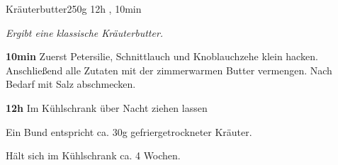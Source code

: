 \documentclass[../recipe-collections/cooking.tex]{subfiles}
\begin{document}
\begin{recipe}{Kräuterbutter}{250g }{12h , 10min }

  \freeform{}\textit{Ergibt eine klassische Kräuterbutter.}


  \textbf{10min}
  Zuerst Petersilie, Schnittlauch und Knoblauchzehe klein hacken.
  Anschließend alle Zutaten mit der zimmerwarmen Butter vermengen.
  Nach Bedarf mit Salz abschmecken.

  \newstep{}\textbf{12h}
  Im Kühlschrank über Nacht ziehen lassen

  \freeform{}\hrulefill{}

  \freeform{}
  Ein Bund entspricht ca. 30g gefriergetrockneter Kräuter.

  \freeform{}
  Hält sich im Kühlschrank ca. 4 Wochen.

\end{recipe}
\end{document}

